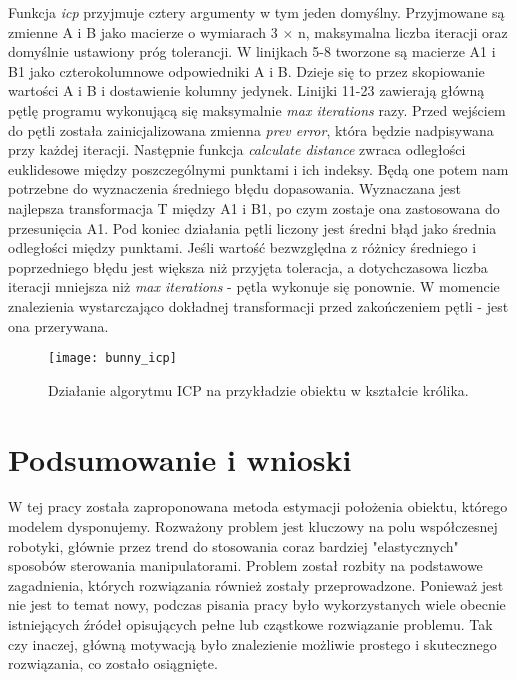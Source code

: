 \documentclass{article}
\begin{document}
Funkcja \emph{icp} przyjmuje cztery argumenty w tym jeden domyślny. Przyjmowane są zmienne A i B jako macierze o wymiarach 3 $\times$ n, maksymalna liczba iteracji oraz domyślnie ustawiony próg tolerancji. W linijkach 5-8 tworzone są macierze A1 i B1 jako czterokolumnowe odpowiedniki A i B. Dzieje się to przez skopiowanie wartości A i B i dostawienie kolumny jedynek. Linijki 11-23 zawierają główną pętlę programu wykonującą się maksymalnie \emph{max iterations} razy. Przed wejściem do pętli została zainicjalizowana zmienna \emph{prev error}, która będzie nadpisywana przy każdej iteracji. Następnie funkcja \emph{calculate distance} zwraca odległości euklidesowe między poszczególnymi punktami i ich indeksy. Będą one potem nam potrzebne do wyznaczenia średniego błędu dopasowania. Wyznaczana jest najlepsza transformacja T między A1 i B1, po czym zostaje ona zastosowana do przesunięcia A1. Pod koniec działania pętli liczony jest średni błąd jako średnia odległości między punktami. Jeśli wartość bezwzględna z różnicy średniego i poprzedniego błędu jest większa niż przyjęta toleracja, a dotychczasowa liczba iteracji mniejsza niż \emph{max iterations} - pętla wykonuje się ponownie. W momencie znalezienia wystarczająco dokładnej transformacji przed zakończeniem pętli - jest ona przerywana.

\begin{figure}[h!]
\centering
\texttt{[image: bunny\_icp]}
\caption{Działanie algorytmu ICP na przykładzie obiektu w kształcie królika.}
\end{figure}

\newpage
\section{\LARGE{Podsumowanie i wnioski}}
W tej pracy została zaproponowana metoda estymacji położenia obiektu, którego modelem dysponujemy. Rozważony problem jest kluczowy na polu współczesnej robotyki, głównie przez trend do stosowania coraz bardziej "elastycznych" sposobów sterowania manipulatorami. Problem został rozbity na podstawowe zagadnienia, których rozwiązania również zostały przeprowadzone. Ponieważ jest nie jest to temat nowy, podczas pisania pracy było wykorzystanych wiele obecnie istniejących źródeł opisujących pełne lub cząstkowe rozwiązanie problemu. Tak czy inaczej, główną motywacją było znalezienie możliwie prostego i skutecznego rozwiązania, co zostało osiągnięte. 
\end{document}
